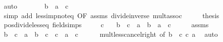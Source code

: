 \begin{isabellebody}
\ auto\isanewline
\ \ \isamarkupfalse%
\ \isamarkupfalse%
\ {\isachardoublequoteopen}{\isachardot}{\kern0pt}{\isachardot}{\kern0pt}{\isachardot}{\kern0pt}\ {\isasymlongleftrightarrow}\ b\ {\isasymle}\ a\ {\isacharasterisk}{\kern0pt}\ c{\isachardoublequoteclose}\isanewline
\ \ \ \ \isamarkupfalse%
\ {\isacharparenleft}{\kern0pt}simp\ add{\isacharcolon}{\kern0pt}\ less{\isacharunderscore}{\kern0pt}imp{\isacharunderscore}{\kern0pt}not{\isacharunderscore}{\kern0pt}eq{}\ {\isacharbrackleft}{\kern0pt}OF\ assms{\isacharbrackright}{\kern0pt}\ divide{\isacharunderscore}{\kern0pt}inverse\ mult{\isachardot}{\kern0pt}assoc{\isacharparenright}{\kern0pt}\isanewline
\ \ \isamarkupfalse%
\ \isamarkupfalse%
\ {\isacharquery}{\kern0pt}thesis\ \isacommand{{\isachardot}{\kern0pt}}\isamarkupfalse%
\isanewline
{}\isamarkupfalse%
%
\endisatagproof
{\isafoldproof}%
%
\isadelimproof
\isanewline
%
\endisadelimproof
\isanewline
{}\isamarkupfalse%
\ pos{\isacharunderscore}{\kern0pt}divide{\isacharunderscore}{\kern0pt}less{\isacharunderscore}{\kern0pt}eq\ {\isacharbrackleft}{\kern0pt}field{\isacharunderscore}{\kern0pt}simps{\isacharbrackright}{\kern0pt}{\isacharcolon}{\kern0pt}\isanewline
\ \ \ {\isachardoublequoteopen}{}\ {\isacharless}{\kern0pt}\ c{\isachardoublequoteclose}\isanewline
\ \ \ {\isachardoublequoteopen}b\ {\isacharslash}{\kern0pt}\ c\ {\isacharless}{\kern0pt}\ a\ {\isasymlongleftrightarrow}\ b\ {\isacharless}{\kern0pt}\ a\ {\isacharasterisk}{\kern0pt}\ c{\isachardoublequoteclose}\isanewline
%
\isadelimproof
%
\endisadelimproof
%
\isatagproof
{}\isamarkupfalse%
\ {\isacharminus}{\kern0pt}\isanewline
\ \ \isamarkupfalse%
\ assms\ \isamarkupfalse%
\ {\isachardoublequoteopen}b\ {\isacharslash}{\kern0pt}\ c\ {\isacharless}{\kern0pt}\ a\ {\isasymlongleftrightarrow}\ {\isacharparenleft}{\kern0pt}b\ {\isacharslash}{\kern0pt}\ c{\isacharparenright}{\kern0pt}\ {\isacharasterisk}{\kern0pt}\ c\ {\isacharless}{\kern0pt}\ a\ {\isacharasterisk}{\kern0pt}\ c{\isachardoublequoteclose}\isanewline
\ \ \ \ \isamarkupfalse%
\ mult{\isacharunderscore}{\kern0pt}less{\isacharunderscore}{\kern0pt}cancel{\isacharunderscore}{\kern0pt}right\ {\isacharbrackleft}{\kern0pt}of\ {\isachardoublequoteopen}b\ {\isacharslash}{\kern0pt}\ c{\isachardoublequoteclose}\ c\ a{\isacharbrackright}{\kern0pt}\ \isamarkupfalse%
\ auto\isanewline
\ \ \isamarkupfalse%

\end{isabellebody}
